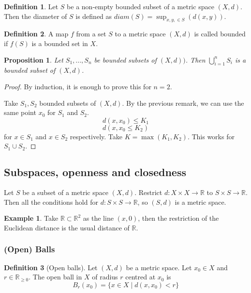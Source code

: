 \documentclass{article}
\theoremstyle{definition}
\newtheorem{defn}{Definition}[section]
\newtheorem{exmp}{Example}[section]
\theoremstyle{plain}%
\newtheorem{prop}[thm]{Proposition}
\theoremstyle{remark}
\begin{document}
\begin{defn}
Let $S$ be a non-empty bounded subset of a metric space $(X, d)$. Then the diameter of $S$ is defined as $diam(S) = \sup_{x,y, \in S}(d(x,y))$.
\end{defn}

\begin{defn}
A map $f$ from a set $S$ to a metric space $(X,d)$ is called bounded if $f(S)$ is a bounded set in $X$.
\end{defn}

\begin{prop}
Let $S_1, ... , S_n$ be bounded subsets of $(X,d))$. Then $\bigcup_{i=1}^n S_i$ is a bounded subset of $(X,d)$.
\end{prop}

\begin{proof}
By induction, it is enough to prove this for $n=2$.

Take $S_1, S_2$ bounded subsets of $(X,d)$. By the previous remark, we can use the same point $x_0$ for $S_1$ and $S_2$. \[d(x, x_0) \le K_1\] \[d(x, x_0 \le K_2)\] for $x \in S_1$ and $x \in S_2$ respectively. Take $K = \max(K_1, K_2)$. This works for $S_1 \cup S_2$.
\end{proof}

\subsection{Subspaces, openness and closedness}

Let $S$ be a subset of a metric space $(X,d)$. Restrict $d : X \times X \to \mathbb{R}$ to $S \times S \to \mathbb{R}$. Then all the conditions hold for $d:  S \times S \to \mathbb{R}$, so $(S,d)$ is a metric space.

\begin{exmp}
Take $\mathbb{R} \subset \mathbb{R}^2$ as the line $(x,0)$, then the restriction of the Euclidean distance is the usual distance of $\mathbb{R}$.
\end{exmp}

\subsubsection{(Open) Balls}

\begin{defn}[Open balls]
Let $(X,d)$ be a metric space. Let $x_0 \in X$ and $r \in \mathbb{R}_{\ge 0}$. The open ball in $X$ of radius $r$ centred at $x_0$ is \[B_r(x_0) = \{x \in X \; | \; d(x, x_0) < r\}\]
\end{defn}
\end{document}
